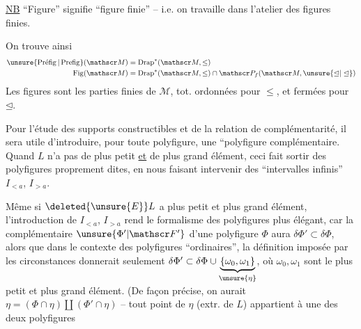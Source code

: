 
\uline{NB} ``Figure'' signifie ``figure finie'' -- i.e. on travaille dans l'atelier  des figures finies.

On trouve ainsi
\[
\begin{aligned}
\unsure{\operatorname{Pr\acute{e}fig}|\operatorname{Prefig}}(\mathscr M)&=\operatorname{Drap}^*(\mathscr M,\leq)\\
\operatorname{Fig}(\mathscr M)&=\operatorname{Drap}^*(\mathscr M,\leq)\cap\mathscr P_f(\mathscr M,\unsure{\unlhd|\trianglelefteq})
\end{aligned}
\]
Les figures sont les parties finies de $\mathscr M$, tot. ordonnées pour $\leq$, et fermées pour $\unlhd$.

Pour l'étude des supports constructibles et de la relation de complémentarité, il sera utile d'introduire, pour toute polyfigure, une ``polyfigure complémentaire. Quand $L$ n'a pas de plus petit \uline{et} de plus grand élément, ceci fait sortir des polyfigures proprement dites, en nous faisant intervenir des  ``intervalles infinis'' $I_{<a}$, $I_{>a}$.

Même si $\deleted{\unsure{E}}L$ a plus petit et plus grand élément, l'introduction de $I_{<a}$, $I_{>a}$ rend le formalisme des polyfigures plus élégant, car la complémentaire $\unsure{\Phi'|\mathscr F'}$ d'une polyfigure $\Phi$ aura $\delta\Phi'\subset\delta\Phi$, alors que  dans le contexte des polyfigures ``ordinaires'', la définition imposée par les circonstances donnerait seulement $\delta\Phi'\subset\delta\Phi\cup\underbrace{\{\omega_0,\omega_1\}}_{\unsure{\eta}}$, où $\omega_0,\omega_1$ sont le plus petit et plus grand élément. (De façon précise, on aurait $\eta=(\Phi\cap\eta)\amalg(\Phi'\cap\eta)$ -- tout point de $\eta$ (extr. de $L$) appartient à une des deux polyfigures
